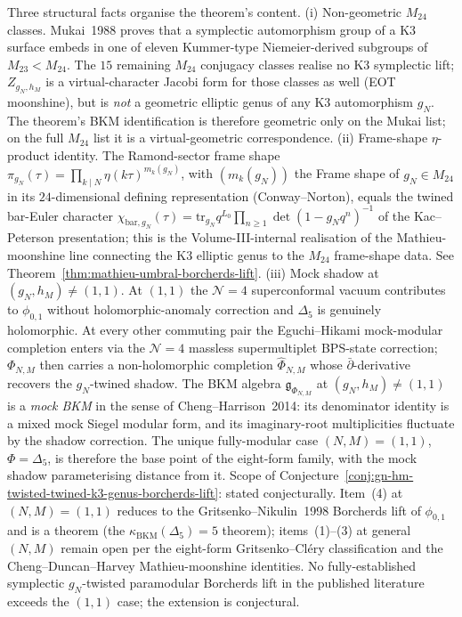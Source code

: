 \begin{remark}
\label{rem:mukai-m23-frame-shape-mock-shadow}
Three structural facts organise the theorem's content.
\textup{(i) Non-geometric $M_{24}$ classes.}
Mukai~\textup{1988} proves that a symplectic automorphism group
of a K3 surface embeds in one of eleven Kummer-type
Niemeier-derived subgroups of $M_{23} < M_{24}$. The
$15$ remaining $M_{24}$ conjugacy classes realise no K3
symplectic lift; $Z_{g_N, h_M}$ is a virtual-character Jacobi
form for those classes as well \textup{(}EOT moonshine\textup{)},
but is \emph{not} a geometric elliptic genus of any K3
automorphism $g_N$. The theorem's BKM identification is
therefore geometric only on the Mukai list; on the full
$M_{24}$ list it is a virtual-geometric correspondence.
\textup{(ii) Frame-shape $\eta$-product identity.} The
Ramond-sector frame shape
$\pi_{g_N}(\tau) = \prod_{k \mid N}\eta(k\tau)^{m_k(g_N)}$,
with $(m_k(g_N))$ the Frame shape of $g_N \in M_{24}$ in its
$24$-dimensional defining representation \textup{(}Conway--Norton\textup{)},
equals the twined bar-Euler character
$\chi_{\mathrm{bar}, g_N}(\tau) = \mathrm{tr}_{g_N}
q^{L_0}\prod_{n \ge 1}\det(1 - g_N q^n)^{-1}$ of the
Kac--Peterson presentation; this is the Volume-III-internal
realisation of the Mathieu-moonshine line connecting the K3
elliptic genus to the $M_{24}$ frame-shape data. See
Theorem~\ref{thm:mathieu-umbral-borcherds-lift}.
\textup{(iii) Mock shadow at $(g_N, h_M) \ne (1, 1)$.} At
$(1, 1)$ the $\mathcal N = 4$ superconformal vacuum contributes
to $\phi_{0,1}$ without holomorphic-anomaly correction and
$\Delta_5$ is genuinely holomorphic. At every other commuting
pair the Eguchi--Hikami mock-modular completion enters via
the $\mathcal N = 4$ massless supermultiplet BPS-state
correction; $\Phi_{N, M}$ then carries a non-holomorphic
completion $\widehat\Phi_{N, M}$ whose $\bar\partial$-derivative
recovers the $g_N$-twined shadow. The BKM algebra
$\mathfrak g_{\Phi_{N, M}}$ at $(g_N, h_M)\ne(1,1)$ is a
\emph{mock BKM} in the sense of Cheng--Harrison~\textup{2014}:
its denominator identity is a mixed mock Siegel modular form,
and its imaginary-root multiplicities fluctuate by the shadow
correction. The unique fully-modular case
$(N, M) = (1, 1)$, $\Phi = \Delta_5$, is therefore the base
point of the eight-form family, with the mock shadow
parameterising distance from it. Scope of
Conjecture~\ref{conj:gn-hm-twisted-twined-k3-genus-borcherds-lift}:
stated conjecturally. Item~(4) at $(N, M) = (1, 1)$ reduces to
the Gritsenko--Nikulin~\textup{1998} Borcherds lift of
$\phi_{0,1}$ and is a theorem \textup{(}the $\kappa_{\mathrm{BKM}}(\Delta_5)=5$ theorem\textup{)};
items~(1)--(3) at general $(N, M)$ remain open per the eight-form
Gritsenko--Cl\'ery classification and the
Cheng--Duncan--Harvey Mathieu-moonshine identities. No
fully-established symplectic $g_N$-twisted paramodular
Borcherds lift in the published literature exceeds the
$(1, 1)$ case; the extension is conjectural.
\end{remark}

